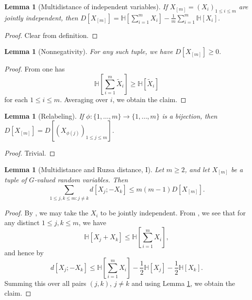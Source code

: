 \documentclass[10pt,a4paper]{article}
\newtheorem{lemma}[theorem]{Lemma}
\newcommand{\lean}[1]{}
\newcommand{\uses}[1]{}
\newcommand{\leanok}{}
\newcommand{\bbH}{\mathbb{H}}
\begin{document}
\begin{lemma}[Multidistance of independent variables]\label{multidist-indep}\lean{multiDist_indep}\leanok  If $X_{[m]} = (X_i)_{1 \leq i \leq m}$ are jointly independent, then $D[X_{[m]}] = \bbH[\sum_{i=1}^m X_i] - \frac{1}{m} \sum_{i=1}^m \bbH[X_i]$.
\end{lemma}

\begin{proof}\uses{multidist-def}\leanok  Clear from definition.
\end{proof}

\begin{lemma}[Nonnegativity]\label{multidist-nonneg}\lean{multiDist_nonneg}\uses{multidist-def}\leanok  For any such tuple, we have $D[X_{[m]}] \geq 0$.
\end{lemma}

\begin{proof}\uses{sumset-lower}\leanok  From  one has
$$ \bbH[\sum_{i =1}^m \tilde X_i] \geq \bbH[\tilde X_i]$$
for each $1 \leq i \leq m$.  Averaging over $i$, we obtain the claim.
\end{proof}

\begin{lemma}[Relabeling]\label{multidist-perm}\lean{multiDist_of_perm}\uses{multidist-def}\leanok If $\phi: \{1,\dots,m\} \to \{1,\dots,m\}$ is a bijection, then $D[X_{[m]}] = D[(X_{\phi(j)})_{1 \leq j \leq m}]$.
\end{lemma}

\begin{proof}\leanok Trivial.
\end{proof}

\begin{lemma}[Multidistance and Ruzsa distance, I]\label{multidist-ruzsa-I}\lean{multidist_ruzsa_I}\uses{multidist-def}\leanok
  Let $m \ge 2$, and let $X_{[m]}$ be a tuple of $G$-valued random variables. Then
  $$\sum_{1 \leq j,k \leq m: j \neq k} d[X_j; -X_k] \leq m(m-1) D[X_{[m]}].$$
\end{lemma}

\begin{proof}\uses{ruz-copy, sumset-lower, ruz-indep, multidist-indep, multidist-copy}\leanok
By ,  we may take the $X_i$ to be jointly independent.  From , we see that for any distinct $1 \leq j,k \leq m$, we have
  \[
    \bbH[X_j+X_k] \leq \bbH[\sum_{i=1}^m X_i],
  \]
  and hence by 
  \[
    d[X_j;-X_k] \leq \bbH[\sum_{i=1}^m X_i] - \frac{1}{2} \bbH[X_j] - \frac{1}{2} \bbH[X_k].
  \]
  Summing this over all pairs $(j,k)$, $j \neq k$ and using Lemma \ref{multidist-indep}, we obtain the claim.
\end{proof}
\end{document}
